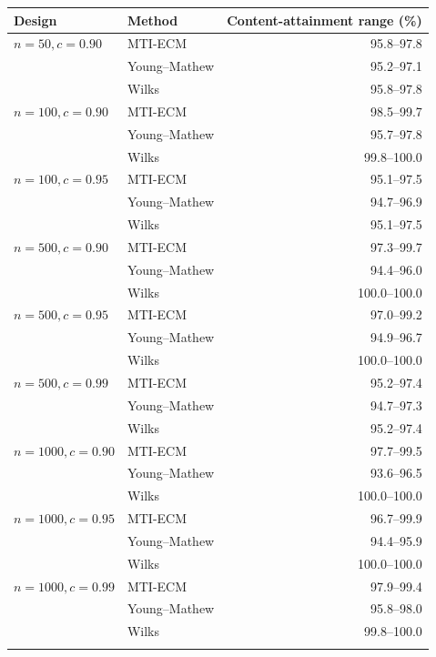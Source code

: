 \begin{tabular}{@{}l@{\hspace{0.75em}}l@{\hspace{0.75em}}r@{}}
\toprule
Design & Method & Content-attainment range (\%)\\
\midrule
\(n=50,c=0.90\) & MTI-ECM & 95.8--97.8 \\
 & Young--Mathew & 95.2--97.1 \\
 & Wilks & 95.8--97.8 \\
\addlinespace[0.25em]
\(n=100,c=0.90\) & MTI-ECM & 98.5--99.7 \\
 & Young--Mathew & 95.7--97.8 \\
 & Wilks & 99.8--100.0 \\
\addlinespace[0.25em]
\(n=100,c=0.95\) & MTI-ECM & 95.1--97.5 \\
 & Young--Mathew & 94.7--96.9 \\
 & Wilks & 95.1--97.5 \\
\addlinespace[0.25em]
\(n=500,c=0.90\) & MTI-ECM & 97.3--99.7 \\
 & Young--Mathew & 94.4--96.0 \\
 & Wilks & 100.0--100.0 \\
\addlinespace[0.25em]
\(n=500,c=0.95\) & MTI-ECM & 97.0--99.2 \\
 & Young--Mathew & 94.9--96.7 \\
 & Wilks & 100.0--100.0 \\
\addlinespace[0.25em]
\(n=500,c=0.99\) & MTI-ECM & 95.2--97.4 \\
 & Young--Mathew & 94.7--97.3 \\
 & Wilks & 95.2--97.4 \\
\addlinespace[0.25em]
\(n=1000,c=0.90\) & MTI-ECM & 97.7--99.5 \\
 & Young--Mathew & 93.6--96.5 \\
 & Wilks & 100.0--100.0 \\
\addlinespace[0.25em]
\(n=1000,c=0.95\) & MTI-ECM & 96.7--99.9 \\
 & Young--Mathew & 94.4--95.9 \\
 & Wilks & 100.0--100.0 \\
\addlinespace[0.25em]
\(n=1000,c=0.99\) & MTI-ECM & 97.9--99.4 \\
 & Young--Mathew & 95.8--98.0 \\
 & Wilks & 99.8--100.0 \\
\addlinespace[0.25em]
\bottomrule
\end{tabular}

